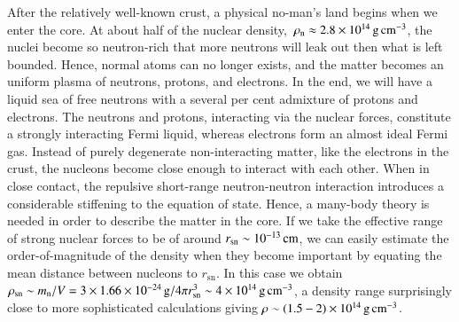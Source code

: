 
After the relatively well-known crust, a physical no-man's land begins when we enter the core.
At about half of the nuclear density, $\, \rho_{\mathrm{n}}  \approx 2.8 \times 10^{14}\, \mathrm{g}\,\mathrm{cm}^{-3}$, the nuclei become so neutron-rich that more neutrons will leak out then what is left bounded.
Hence, normal atoms can no longer exists, and the matter becomes an uniform plasma of neutrons, protons, and electrons.
In the end, we will have a liquid sea of free neutrons with a several per cent admixture of protons and electrons.
The neutrons and protons, interacting via the nuclear forces, constitute a strongly interacting Fermi liquid, whereas electrons form an almost ideal Fermi gas.
Instead of purely degenerate non-interacting matter, like the electrons in the crust, the nucleons become close enough to interact with each other.
When in close contact, the repulsive short-range neutron-neutron interaction introduces a considerable stiffening to the equation of state.
Hence, a many-body theory is needed in order to describe the matter in the core.
If we take the effective range of strong nuclear forces to be of around $r_{\mathrm{sn}} \sim 10^{-13}\, \mathrm{cm}$, we can easily estimate the order-of-magnitude of the density when they become important by equating the mean distance between nucleons to $r_{\mathrm{sn}}$.
In this case we obtain $\rho_{\mathrm{sn}} \sim m_{\mathrm{n}} / V = 3 \times 1.66 \times 10^{-24} \, \mathrm{g} / 4\pi r_{\mathrm{sn}}^3 \sim 4 \times 10^{14} \, \mathrm{g}\,\mathrm{cm}^{-3}$, a density range surprisingly close to more sophisticated calculations giving $\rho \sim (1.5 - 2) \times 10^{14} \, \mathrm{g}\,\mathrm{cm}^{-3}$.\cite{Hund36}


